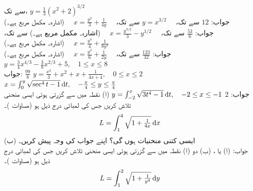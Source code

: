  سے  تک،
$y=\tfrac{1}{3}(x^2+2)^{3/2}\quad$\\
جواب:\quad
$12$
 سے تک،
$y=x^{3/2}\quad$
 سے  تک،
$\quad x=\tfrac{y^3}{3}+\tfrac{1}{4y}\quad$
  (اشارہ۔  مکمل مربع ہے۔)\\
جواب:\quad
$\tfrac{53}{6}$
 سے  تک،
$\quad x=\tfrac{y^{3/2}}{3}-y^{1/2}\quad$
(اشارہ۔  مکمل مربع ہے۔)
 سے  تک،
$\quad x=\tfrac{y^4}{4}+\tfrac{1}{8y^2}\quad$
(اشارہ۔  مکمل مربع ہے۔)\\
جواب:\quad
$\tfrac{123}{32}$
 سے  تک،
$\quad x=\tfrac{y^3}{6}+\tfrac{1}{2y}\quad$
(اشارہ۔  مکمل مربع ہے۔)
$y=\tfrac{3}{4}x^{4/3}-\tfrac{3}{8}x^{2/3}+5,\quad 1\le x\le 8$\\
جواب:\quad
$\tfrac{99}{8}$
$y=\tfrac{x^3}{3}+x^2+x+\tfrac{1}{4x+4},\quad 0\le x\le 2$
$x=\int_0^y\sqrt{\sec^4t-1}\dif t,\quad -\tfrac{\pi}{4}\le y\le \tfrac{\pi}{4}$\\
جواب:\quad
$2$
$y=\int_{-2}^x\sqrt{3t^4-1}\dif t,\quad -2\le x\le-1$
(ا) نقطہ  میں سے گزرتی ہوئی ایسی منحنی تلاش کریں جس کی لمبائی درج ذیل ہو (مساوات )۔
\begin{align*}
L=\int_1^4\sqrt{1+\tfrac{1}{4x}}\dif x
\end{align*}
(ب) ایسی کتنی منحنیات ہوں گی؟ اپنے جواب کی وجہ پیش کریں۔ \\
جواب:\quad
(ا)  یا ، (ب) دو
(ا) نقطہ  میں سے گزرتی ہوئی ایسی منحنی تلاش کریں جس کی لمبائی درج ذیل ہو (مساوات )۔
\begin{align*}
L=\int_1^2\sqrt{1+\tfrac{1}{y^4}}\dif y
\end{align*}
